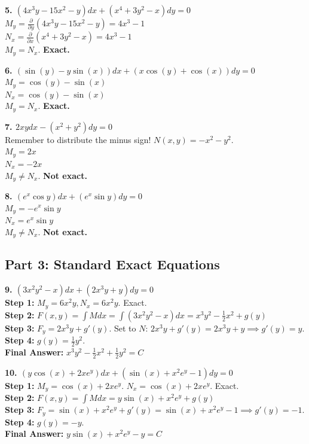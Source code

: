 \documentclass[11pt]{article}
\begin{document}
\textbf{5. $(4x^3 y - 15x^2 - y)dx + (x^4 + 3y^2 - x)dy = 0$} \\
$M_y = \frac{\partial}{\partial y}(4x^3 y - 15x^2 - y) = 4x^3 - 1$ \\
$N_x = \frac{\partial}{\partial x}(x^4 + 3y^2 - x) = 4x^3 - 1$ \\
$M_y = N_x$. \textbf{Exact.}

\textbf{6. $(\sin(y) - y \sin(x))dx + (x \cos(y) + \cos(x))dy = 0$} \\
$M_y = \cos(y) - \sin(x)$ \\
$N_x = \cos(y) - \sin(x)$ \\
$M_y = N_x$. \textbf{Exact.}

\textbf{7. $2xydx - (x^2 + y^2)dy = 0$} \\
Remember to distribute the minus sign! $N(x,y) = -x^2 - y^2$. \\
$M_y = 2x$ \\
$N_x = -2x$ \\
$M_y \neq N_x$. \textbf{Not exact.}

\textbf{8. $(e^x \cos y)dx + (e^x \sin y)dy = 0$} \\
$M_y = -e^x \sin y$ \\
$N_x = e^x \sin y$ \\
$M_y \neq N_x$. \textbf{Not exact.}

\subsection*{Part 3: Standard Exact Equations}

\textbf{9. $(3x^2 y^2 - x)dx + (2x^3 y + y)dy = 0$} \\
\textbf{Step 1:} $M_y = 6x^2 y, N_x = 6x^2 y$. Exact. \\
\textbf{Step 2:} $F(x,y) = \int M dx = \int (3x^2 y^2 - x) dx = x^3 y^2 - \frac{1}{2}x^2 + g(y)$ \\
\textbf{Step 3:} $F_y = 2x^3 y + g'(y)$. Set to $N$: $2x^3 y + g'(y) = 2x^3 y + y \implies g'(y) = y$. \\
\textbf{Step 4:} $g(y) = \frac{1}{2}y^2$. \\
\textbf{Final Answer:} $x^3 y^2 - \frac{1}{2}x^2 + \frac{1}{2}y^2 = C$

\textbf{10. $(y \cos(x) + 2xe^y)dx + (\sin(x) + x^2 e^y - 1)dy = 0$} \\
\textbf{Step 1:} $M_y = \cos(x) + 2xe^y$. $N_x = \cos(x) + 2xe^y$. Exact. \\
\textbf{Step 2:} $F(x,y) = \int M dx = y \sin(x) + x^2 e^y + g(y)$ \\
\textbf{Step 3:} $F_y = \sin(x) + x^2 e^y + g'(y) = \sin(x) + x^2 e^y - 1 \implies g'(y) = -1$. \\
\textbf{Step 4:} $g(y) = -y$. \\
\textbf{Final Answer:} $y \sin(x) + x^2 e^y - y = C$
\end{document}
